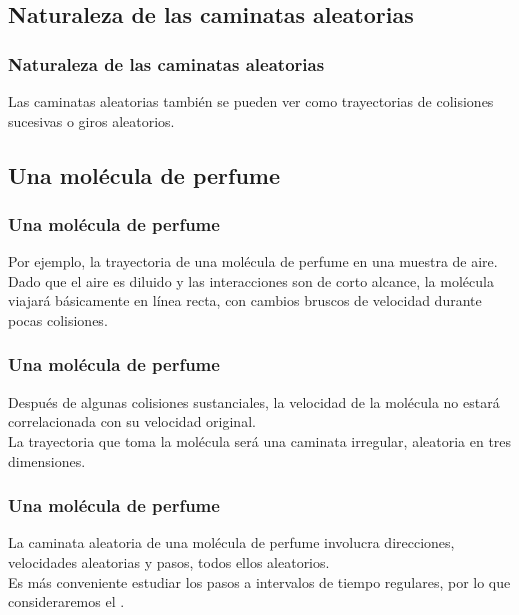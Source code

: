 \documentclass[12pt]{beamer}
\begin{document}

\subsection*{Naturaleza de las caminatas aleatorias}

\begin{frame}
\frametitle{Naturaleza de las caminatas aleatorias}
Las caminatas aleatorias también se pueden ver como trayectorias de colisiones sucesivas o giros aleatorios.
\end{frame}

\subsection{Una molécula de perfume}

\begin{frame}
\frametitle{Una molécula de perfume}
Por ejemplo, la trayectoria de una molécula de perfume en una muestra de aire.
\\
\bigskip
\pause
Dado que el aire es diluido y las interacciones son de corto alcance, la molécula viajará básicamente en línea recta, con cambios bruscos de velocidad durante pocas colisiones.
\end{frame}
\begin{frame}
\frametitle{Una molécula de perfume}
Después de algunas colisiones sustanciales, la velocidad de la molécula no estará correlacionada con su velocidad original.
\\
\bigskip
\pause
La trayectoria que toma la molécula será una caminata irregular, aleatoria en tres dimensiones.
\end{frame}
\begin{frame}
\frametitle{Una molécula de perfume}
La caminata aleatoria de una molécula de perfume involucra direcciones, velocidades aleatorias y pasos, todos ellos aleatorios.
\\
\bigskip
\pause
Es más conveniente estudiar los pasos a intervalos de tiempo regulares, por lo que consideraremos el .
\end{frame}
\end{document}
